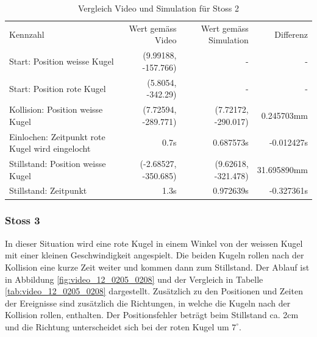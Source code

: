 \begin{table}[ht]
    \begin{tabular}{ lrrr }
        \rowcolor{\seccolor!50}
        Kennzahl & Wert gemäss Video & Wert gemäss Simulation & Differenz \\
        Start: Position weisse Kugel & (9.99188, -157.766) & - & -\\
        Start: Position rote Kugel & (5.8054, -342.29) & - & -\\
        Kollision: Position weisse Kugel & (7.72594, -289.771) & (7.72172, -290.017) & 0.245703mm\\
        Einlochen: Zeitpunkt rote Kugel wird eingelocht & 0.7s & 0.687573s & -0.012427s\\
        Stillstand: Position weisse Kugel & (-2.68527, -350.685) & (9.62618, -321.478) & 31.695890mm\\
        Stillstand: Zeitpunkt & 1.3s & 0.972639s & -0.327361s\\
    \end{tabular}
    \caption{Vergleich Video und Simulation für Stoss 2}
    \label{tab:simulation_vs_reality_1_0028_0032}
\end{table}

\subsubsection{Stoss 3}
In dieser Situation wird eine rote Kugel in einem Winkel von der weissen Kugel mit einer kleinen Geschwindigkeit angespielt.
Die beiden Kugeln rollen nach der Kollision eine kurze Zeit weiter und kommen dann zum Stillstand.
Der Ablauf ist in Abbildung \ref{fig:video_12_0205_0208} und der Vergleich in Tabelle \ref{tab:video_12_0205_0208} dargestellt.
Zusätzlich zu den Positionen und Zeiten der Ereignisse sind zusätzlich die Richtungen, in welche die Kugeln nach der Kollision
rollen, enthalten.
Der Positionsfehler beträgt beim Stillstand ca. 2cm und die Richtung unterscheidet sich bei der roten Kugel um $7^{\circ}$.

